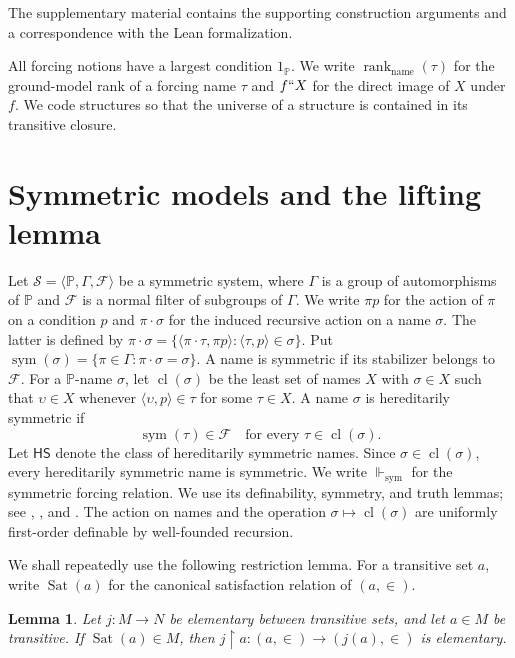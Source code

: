 \documentclass[11pt,a4paper]{amsart}
\newcommand{\HS}{\mathsf{HS}}
\newcommand{\sym}{\operatorname{sym}}
\newcommand{\namerank}{\operatorname{rank}_{\mathrm{name}}}
\newcommand{\forcesS}{\Vdash_{\mathrm{sym}}}
\newcommand{\restr}{\mathbin{\upharpoonright}}
\theoremstyle{plain}
\newtheorem{lemma}[theorem]{Lemma}
\theoremstyle{definition}
\theoremstyle{remark}
\begin{document}
The supplementary material \cite{Supplement} contains the supporting construction arguments and a correspondence with the Lean formalization.

All forcing notions have a largest condition $1_{\mathbb P}$.  We write $\namerank(\tau)$ for the ground-model rank of a forcing name $\tau$ and $f``X$ for the direct image of $X$ under $f$.  We code structures so that the universe of a structure is contained in its transitive closure.

\section{Symmetric models and the lifting lemma}

Let $\mathscr S=\langle\mathbb P,\Gamma,\mathcal F\rangle$ be a symmetric system, where $\Gamma$ is a group of automorphisms of $\mathbb P$ and $\mathcal F$ is a normal filter of subgroups of $\Gamma$.  We write $\pi p$ for the action of $\pi$ on a condition $p$ and $\pi\cdot\sigma$ for the induced recursive action on a name $\sigma$.  The latter is defined by
$\pi\cdot\sigma=\{\langle\pi\cdot\tau,\pi p\rangle:\langle\tau,p\rangle\in\sigma\}$.  Put $\sym(\sigma)=\{\pi\in\Gamma:\pi\cdot\sigma=\sigma\}$.  A name is symmetric if its stabilizer belongs to $\mathcal F$.  For a $\mathbb P$-name $\sigma$, let $\operatorname{cl}(\sigma)$ be the least set of names $X$ with $\sigma\in X$ such that $\upsilon\in X$ whenever $\langle\upsilon,p\rangle\in\tau$ for some $\tau\in X$.  A name $\sigma$ is hereditarily symmetric if
\begin{equation}\label{eq:HS-characterization}
\sym(\tau)\in\mathcal F\quad\text{for every }\tau\in\operatorname{cl}(\sigma).
\end{equation}
Let $\HS$ denote the class of hereditarily symmetric names.  Since $\sigma\in\operatorname{cl}(\sigma)$, every hereditarily symmetric name is symmetric.  We write $\forcesS$ for the symmetric forcing relation.  We use its definability, symmetry, and truth lemmas; see \cite[Chapter~5]{Jech}, \cite[Section~2]{Karagila}, and {\cite[Lemma~2.2 and Theorem~2.5]{HayutKaragilaSmall}}.  The action on names and the operation $\sigma\mapsto\operatorname{cl}(\sigma)$ are uniformly first-order definable by well-founded recursion.

We shall repeatedly use the following restriction lemma.  For a transitive set $a$, write $\operatorname{Sat}(a)$ for the canonical satisfaction relation of $(a,\in)$.

\begin{lemma}\label{lem:restriction-elementarity}
Let $j:M\to N$ be elementary between transitive sets, and let $a\in M$ be transitive.  If $\operatorname{Sat}(a)\in M$, then $j\restr a:(a,\in)\longrightarrow(j(a),\in)$ is elementary.
\end{lemma}
\end{document}
